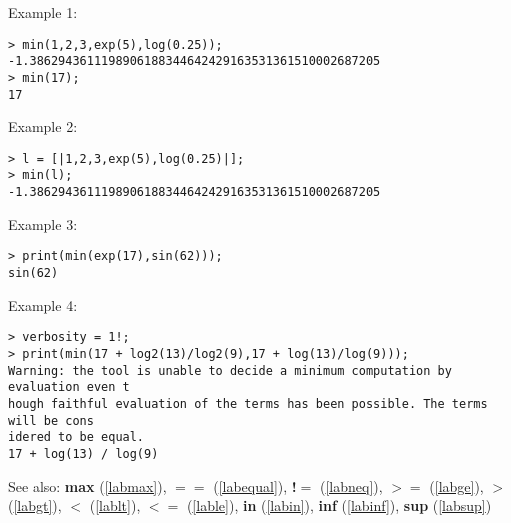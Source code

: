 \noindent Example 1: 
\begin{center}\begin{minipage}{15cm}\begin{Verbatim}[frame=single,commandchars=\\\|\~]
> min(1,2,3,exp(5),log(0.25));
-1.3862943611198906188344642429163531361510002687205
> min(17);
17
\end{Verbatim}
\end{minipage}\end{center}
\noindent Example 2: 
\begin{center}\begin{minipage}{15cm}\begin{Verbatim}[frame=single,commandchars=\\\|\~]
> l = [|1,2,3,exp(5),log(0.25)|];
> min(l);
-1.3862943611198906188344642429163531361510002687205
\end{Verbatim}
\end{minipage}\end{center}
\noindent Example 3: 
\begin{center}\begin{minipage}{15cm}\begin{Verbatim}[frame=single,commandchars=\\\|\~]
> print(min(exp(17),sin(62)));
sin(62)
\end{Verbatim}
\end{minipage}\end{center}
\noindent Example 4: 
\begin{center}\begin{minipage}{15cm}\begin{Verbatim}[frame=single,commandchars=\\\|\~]
> verbosity = 1!;
> print(min(17 + log2(13)/log2(9),17 + log(13)/log(9)));
Warning: the tool is unable to decide a minimum computation by evaluation even t
hough faithful evaluation of the terms has been possible. The terms will be cons
idered to be equal.
17 + log(13) / log(9)
\end{Verbatim}
\end{minipage}\end{center}
See also: \textbf{max} (\ref{labmax}), \textbf{$==$} (\ref{labequal}), \textbf{!$=$} (\ref{labneq}), \textbf{$>=$} (\ref{labge}), \textbf{$>$} (\ref{labgt}), \textbf{$<$} (\ref{lablt}), \textbf{$<=$} (\ref{lable}), \textbf{in} (\ref{labin}), \textbf{inf} (\ref{labinf}), \textbf{sup} (\ref{labsup})
